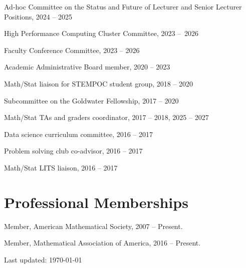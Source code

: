 \documentclass[10pt,letterpaper]{article}
\renewenvironment{itemize}{
  \begin{list}{}{
    \setlength{\leftmargin}{1.5em}
    \setlength{\itemsep}{0.25em}
    \setlength{\parskip}{0pt}
    \setlength{\parsep}{0.25em}
  }
}{
  \end{list}
}
\providecommand{\tightlist}{%
  \setlength{\itemsep}{0pt}\setlength{\parskip}{0pt}}
\let\tightlist\relax
\begin{document}
\begin{itemize}
\tightlist
\item
  Ad-hoc Committee on the Status and Future of Lecturer and Senior
  Lecturer Positions, 2024 -- 2025
\item
  High Performance Computing Cluster Committee, 2023 --~2026
\item
  Faculty Conference Committee, 2023 -- 2026
\item
  Academic Administrative Board member, 2020 -- 2023
\item
  Math/Stat liaison for STEMPOC student group, 2018 -- 2020
\item
  Subcommittee on the Goldwater Fellowship, 2017 -- 2020
\item
  Math/Stat TAs and graders coordinator, 2017 -- 2018, 2025 -- 2027
\item
  Data science curriculum committee, 2016 -- 2017
\item
  Problem solving club co-advisor, 2016 -- 2017
\item
  Math/Stat LITS liaison, 2016 -- 2017
\end{itemize}

\hypertarget{professional-memberships}{%
\section*{Professional Memberships}\label{professional-memberships}}

\begin{itemize}
\tightlist
\item
  Member, American Mathematical Society, 2007 -- Present.
\item
  Member, Mathematical Association of America, 2016 -- Present.
\end{itemize}
\bigskip
{\small Last updated: \today}
\end{document}
